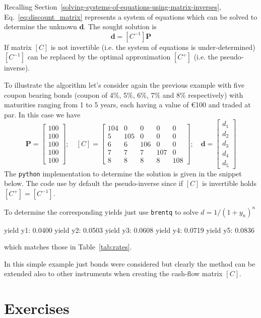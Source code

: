 Recalling Section~\ref{solving-systems-of-equations-using-matrix-inverses}, Eq.~\ref{eq:discount_matrix} represents a system of equations which can be solved to determine the unknown $\boldsymbol{d}$.
The sought solution is 
\begin{equation}
\boldsymbol{d} = [C^{-1}] \boldsymbol{P}
\end{equation} 
If matrix $[C]$ is not invertible (i.e. the system of equations is under-determined) $[C^{-1}]$ can be replaced by the optimal approximation $[C^+]$ (i.e. the pseudo-inverse). 

To illustrate the algorithm let's consider again the previous example with five coupon bearing bonds (coupon of 4\%, 5\%, 6\%, 7\% and 8\% respectively) with maturities ranging from 1 to 5 years, each having a value of \euro{100} and traded at par. In this case we have
\begin{equation*}
\boldsymbol{P} = 
\begin{bmatrix}
100 \\
100 \\
100 \\
100 \\
100 
\end{bmatrix}; \quad
[C] = 
\begin{bmatrix}
104 & 0 & 0 & 0 & 0 \\
5 & 105 & 0 & 0 & 0 \\
6 & 6 & 106 & 0 & 0 \\
7 & 7 & 7 & 107 & 0 \\
8 & 8 & 8 & 8 & 108
\end{bmatrix}; \quad \boldsymbol{d} =
\begin{bmatrix}
d_1 \\
d_2 \\
d_3 \\
d_4 \\
d_5 
\end{bmatrix}
\end{equation*}
The \texttt{python} implementation to determine the solution is given in the snippet below. The code use by default the pseudo-inverse since if $[C]$ is invertible holds $[C^+] = [C^{-1}]$. 


\begin{ioutput}
[0.96153846 0.90659341 0.83765291 0.75756548 0.66938146]	
\end{ioutput}
To determine the corresponding yields just use \texttt{brentq} to solve $d=1/(1+y_n)^{n}$

\begin{ioutput}
yield y1: 0.0400
yield y2: 0.0503
yield y3: 0.0608
yield y4: 0.0719
yield y5: 0.0836
\end{ioutput}
which matches those in Table~\ref{tab:rates}.

In this simple example just bonds were considered but clearly the method can be extended also to other instruments when creating the cash-flow matrix $[C]$.

\section*{Exercises}

